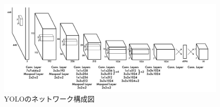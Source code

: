 \begin{figure}[hbtp]
  \begin{center}
    \includegraphics[width=12cm]{figs/yolo_architecture.png}
    \caption{YOLOのネットワーク構成図\cite{yolov3}}
    \label{fig:yolo_network}
  \end{center}
 \end{figure}